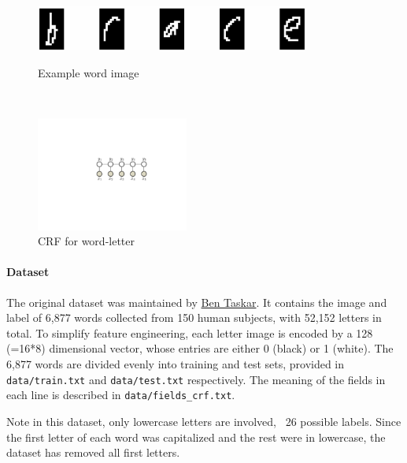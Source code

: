 \documentclass[11pt]{report}
\begin{document}
	
	\begin{figure}[t!]
		\begin{minipage}[b]{0.62\textwidth}
			\centering
			\vspace{-0.6em}
			\includegraphics[width=9cm]{brace.jpg}
			\vspace{0.6em}
			\caption{Example word image}\label{fig:brace}
		\end{minipage}
		~~~
		\begin{minipage}[b]{0.33\textwidth}
			\centering
			\includegraphics[width=5cm]{crf}
			\caption{CRF for word-letter}\label{fig:CRF_model}
		\end{minipage}
	\end{figure}
	
	
	
	\paragraph{Dataset}
	The original dataset was maintained by \href{https://en.wikipedia.org/wiki/Ben_Taskar}{Ben Taskar}.
	It contains the image and label of 6,877 words collected from 150 human subjects,
	with 52,152 letters in total.
	To simplify feature engineering, each letter image is encoded by a 128 (=16*8) dimensional vector,
	whose entries are either 0 (black) or 1 (white).
	The 6,877 words are divided evenly into training and test sets,
	provided in \verb#data/train.txt# and \verb#data/test.txt# respectively.
	The meaning of the fields in each line is described in \verb#data/fields_crf.txt#.
	
	
	Note in this dataset, only lowercase letters are involved, \ie\ 26 possible labels.
	Since the first letter of each word was capitalized and the rest were in lowercase,
	the dataset has removed all first letters.
	
	
\end{document}
